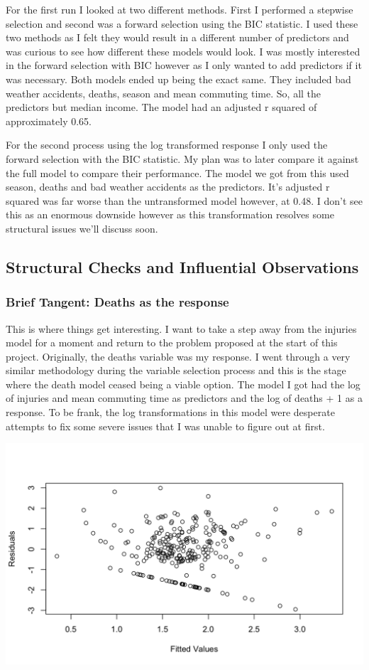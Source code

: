 For the first run I looked at two different methods. First I performed a stepwise selection and second was a forward selection using the BIC statistic. I used these two methods as I felt they would result in a different number of predictors and was curious to see how different these models would look. I was mostly interested in the forward selection with BIC however as I only wanted to add predictors if it was necessary. Both models ended up being the exact same. They included bad weather accidents, deaths, season and mean commuting time. So, all the predictors but median income. The model had an adjusted r squared of approximately 0.65.

For the second process using the log transformed response I only used the forward selection with the BIC statistic. My plan was to later compare it against the full model to compare their performance. The model we got from this used season, deaths and bad weather accidents as the predictors. It's adjusted r squared was far worse than the untransformed model however, at 0.48. I don't see this as an enormous downside however as this transformation resolves some structural issues we'll discuss soon.

\subsection*{Structural Checks and Influential Observations}

\subsubsection*{Brief Tangent: Deaths as the response}

This is where things get interesting. I want to take a step away from the injuries model for a moment and return to the problem proposed at the start of this project. Originally, the deaths variable was my response. I went through a very similar methodology during the variable selection process and this is the stage where the death model ceased being a viable option. The model I got had the log of injuries and mean commuting time as predictors and the log of deaths + 1 as a response. To be frank, the log transformations in this model were desperate attempts to fix some severe issues that I was unable to figure out at first. 

\begin{center}
    \includegraphics[width=0.7\columnwidth]{../presentation/presentation_images/deaths_residual_plot.png}
\end{center}

